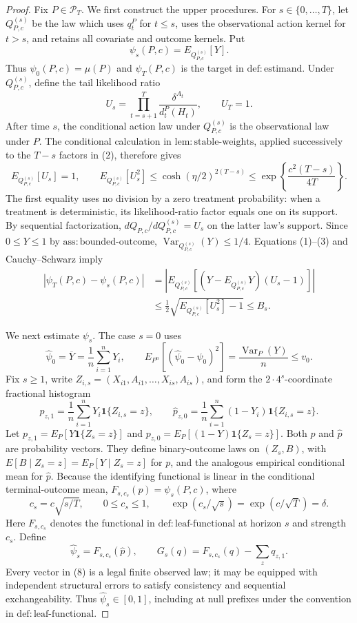 \documentclass{article}
\begin{document}
\begin{proof}
Fix \(P\in\mathcal P_T\).  We first construct the upper procedures.  For \(s\in\{0,\ldots,T\}\), let \(Q_{P,c}^{(s)}\) be the law which uses \(q_t^P\) for \(t\leq s\), uses the observational action kernel for \(t>s\), and retains all covariate and outcome kernels.  Put
\[
\psi_s(P,c)=E_{Q_{P,c}^{(s)}}[Y].
\tag{1}
\]
Thus \(\psi_0(P,c)=\mu(P)\) and \(\psi_T(P,c)\) is the target in \(\mathrm{def:estimand}\).  Under \(Q_{P,c}^{(s)}\), define the tail likelihood ratio
\[
U_s=\prod_{t=s+1}^T\frac{\delta^{A_t}}{d_t^P(H_t)},
\qquad U_T=1.
\tag{2}
\]
After time \(s\), the conditional action law under \(Q_{P,c}^{(s)}\) is the observational law under \(P\).  The conditional calculation in \(\mathrm{lem:stable\text{-}weights}\), applied successively to the \(T-s\) factors in (2), therefore gives
\[
E_{Q_{P,c}^{(s)}}[U_s]=1,
\qquad
E_{Q_{P,c}^{(s)}}[U_s^2]
 \leq\cosh(\eta/2)^{2(T-s)}
 \leq\exp\!\left\{\frac{c^2(T-s)}{4T}\right\}.
\tag{3}
\]
The first equality uses no division by a zero treatment probability: when a treatment is deterministic, its likelihood-ratio factor equals one on its support.  By sequential factorization, \(dQ_{P,c}/dQ_{P,c}^{(s)}=U_s\) on the latter law's support.  Since \(0\leq Y\leq1\) by \(\mathrm{ass:bounded\text{-}outcome}\), \(\operatorname{Var}_{Q_{P,c}^{(s)}}(Y)\leq1/4\).  Equations (1)--(3) and Cauchy--Schwarz imply
\[
\begin{aligned}
|\psi_T(P,c)-\psi_s(P,c)|
 &=\left|E_{Q_{P,c}^{(s)}}[(Y-E_{Q_{P,c}^{(s)}}Y)(U_s-1)]\right|\\
 &\leq\frac12\sqrt{E_{Q_{P,c}^{(s)}}[U_s^2]-1}
 \leq B_s.
\end{aligned}
\tag{4}
\]

We next estimate \(\psi_s\).  The case \(s=0\) uses
\[
\widehat\psi_0=\overline Y=\frac1n\sum_{i=1}^nY_i,
\qquad
E_{P^n}[(\widehat\psi_0-\psi_0)^2]=\frac{\operatorname{Var}_P(Y)}n\leq v_0.
\tag{5}
\]
Fix \(s\geq1\), write \(Z_{i,s}=(X_{i1},A_{i1},\ldots,X_{is},A_{is})\), and form the \(2\cdot4^s\)-coordinate fractional histogram
\[
\widehat p_{z,1}=\frac1n\sum_{i=1}^nY_i\mathbf1\{Z_{i,s}=z\},
\qquad
\widehat p_{z,0}=\frac1n\sum_{i=1}^n(1-Y_i)\mathbf1\{Z_{i,s}=z\}.
\tag{6}
\]
Let \(p_{z,1}=E_P[Y\mathbf1\{Z_s=z\}]\) and \(p_{z,0}=E_P[(1-Y)\mathbf1\{Z_s=z\}]\).  Both \(p\) and \(\widehat p\) are probability vectors.  They define binary-outcome laws on \((Z_s,B)\), with \(E[B\mid Z_s=z]=E_P[Y\mid Z_s=z]\) for \(p\), and the analogous empirical conditional mean for \(\widehat p\).  Because the identifying functional is linear in the conditional terminal-outcome mean, \(F_{s,c_s}(p)=\psi_s(P,c)\), where
\[
c_s=c\sqrt{s/T},
\qquad 0\leq c_s\leq1,
\qquad \exp(c_s/\sqrt s)=\exp(c/\sqrt T)=\delta.
\tag{7}
\]
Here \(F_{s,c_s}\) denotes the functional in \(\mathrm{def:leaf\text{-}functional}\) at horizon \(s\) and strength \(c_s\).  Define
\[
\widehat\psi_s=F_{s,c_s}(\widehat p),
\qquad
G_s(q)=F_{s,c_s}(q)-\sum_zq_{z,1}.
\tag{8}
\]
Every vector in (8) is a legal finite observed law; it may be equipped with independent structural errors to satisfy consistency and sequential exchangeability.  Thus \(\widehat\psi_s\in[0,1]\), including at null prefixes under the convention in \(\mathrm{def:leaf\text{-}functional}\).


\end{proof}
\end{document}
